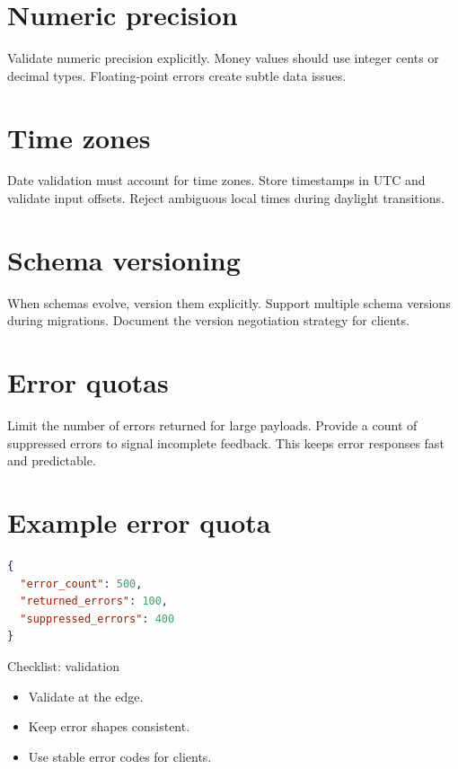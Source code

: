 \section{Numeric precision}
Validate numeric precision explicitly.
Money values should use integer cents or decimal types.
Floating-point errors create subtle data issues.

\section{Time zones}
Date validation must account for time zones.
Store timestamps in UTC and validate input offsets.
Reject ambiguous local times during daylight transitions.

\section{Schema versioning}
When schemas evolve, version them explicitly.
Support multiple schema versions during migrations.
Document the version negotiation strategy for clients.

\section{Error quotas}
Limit the number of errors returned for large payloads.
Provide a count of suppressed errors to signal incomplete feedback.
This keeps error responses fast and predictable.

\section{Example error quota}
\begin{lstlisting}[language=JSON]
{
  "error_count": 500,
  "returned_errors": 100,
  "suppressed_errors": 400
}
\end{lstlisting}

\begin{checklistbox}{Checklist: validation}
\begin{itemize}[nosep]
  \item Validate at the edge.
  \item Keep error shapes consistent.
  \item Use stable error codes for clients.
\end{itemize}
\end{checklistbox}
